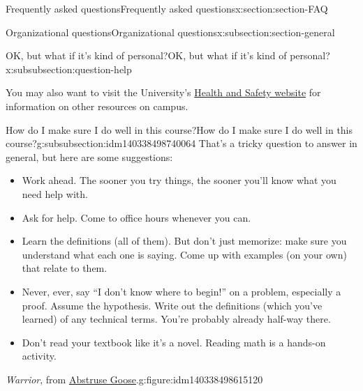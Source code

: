 \documentclass[oneside,10pt,]{article}
\begin{document}
\begin{sectionptx}{Frequently asked questions}{}{Frequently asked questions}{}{}{x:section:section-FAQ}
\begin{subsectionptx}{Organizational questions}{}{Organizational questions}{}{}{x:subsection:section-general}
\begin{subsubsectionptx}{OK, but what if it's kind of personal?}{}{OK, but what if it's kind of personal?}{}{}{x:subsubsection:question-help}
\par
You may also want to visit the University's \href{https://www.uleth.ca/services-for-students/health-safety}{Health and Safety website} for information on other resources on campus.%
\end{subsubsectionptx}
%
%
\typeout{************************************************}
\typeout{************************************************}
%
\begin{subsubsectionptx}{How do I make sure I do well in this course?}{}{How do I make sure I do well in this course?}{}{}{g:subsubsection:idm140338498740064}
That's a tricky question to answer in general, but here are some suggestions:%
\begin{itemize}[label=\textbullet]
\item{}Work ahead. The sooner you try things, the sooner you'll know what you need help with.%
\item{}Ask for help. Come to office hours whenever you can.%
\item{}Learn the definitions (all of them). But don't just memorize: make sure you understand what each one is saying. Come up with examples (on your own) that relate to them.%
\item{}Never, ever, say ``I don't know where to begin!'' on a problem, especially a proof. Assume the hypothesis. Write out the definitions (which you've learned) of any technical terms. You're probably already half-way there.%
\item{}Don't read your textbook like it's a novel. Reading math is a hands-on activity.%
\end{itemize}
%
\begin{figureptx}{\emph{Warrior}, from \href{https://abstrusegoose.com/353}{Abstruse Goose}.}{g:figure:idm140338498615120}{}%
\begin{image}{0.25}{0.5}{0.25}%

\end{image}
\end{figureptx}
\end{subsubsectionptx}
\end{subsectionptx}
\end{sectionptx}
\end{document}
